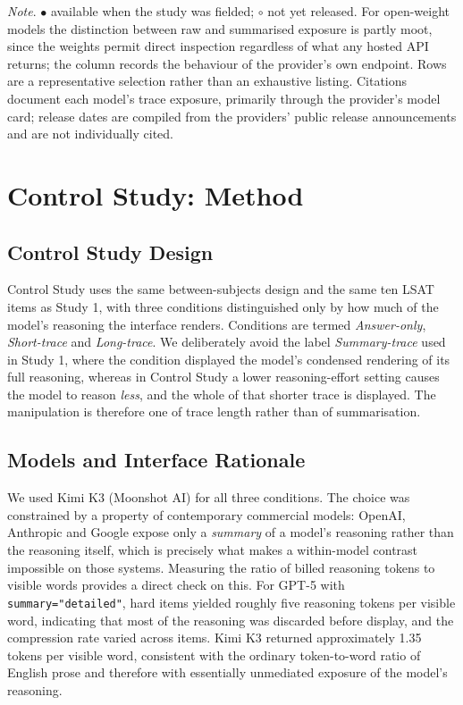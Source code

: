 \documentclass[manuscript,review,anonymous]{acmart}
\begin{document}
\begin{table}[H]
\raggedright \small \textit{Note}. $\bullet$ available when the study was
fielded; $\circ$ not yet released.
For open-weight models the distinction between raw and summarised exposure is
partly moot, since the weights permit direct inspection regardless of what any
hosted API returns; the column records the behaviour of the provider's own
endpoint. Rows are a representative selection rather than an exhaustive listing.
Citations document each model's trace exposure, primarily through the provider's model card; release dates are compiled from the providers' public release announcements and are not individually cited.
\end{table}



\section{Control Study: Method}\label{sec:study2_method}
\subsection{Control Study Design}

Control Study uses the same between-subjects design and the same ten LSAT items as
Study 1, with three conditions distinguished only by how much of the model's
reasoning the interface renders. Conditions are termed \textit{Answer-only},
\textit{Short-trace} and \textit{Long-trace}. We deliberately avoid the label
\textit{Summary-trace} used in Study 1, where the condition displayed the
model's condensed rendering of its full reasoning, whereas in Control Study a lower
reasoning-effort setting causes the model to reason \emph{less}, and the whole
of that shorter trace is displayed. The manipulation is therefore one of trace
length rather than of summarisation.

\subsection{Models and Interface Rationale}
We used Kimi K3 (Moonshot AI) for all three conditions. The choice was
constrained by a property of contemporary commercial models: OpenAI, Anthropic
and Google expose only a \textit{summary} of a model's reasoning rather than the
reasoning itself, which is precisely what makes a within-model contrast
impossible on those systems. Measuring the ratio of billed reasoning tokens to
visible words provides a direct check on this. For GPT-5 with
\texttt{summary="detailed"}, hard items yielded roughly five reasoning tokens per
visible word, indicating that most of the reasoning was discarded before display,
and the compression rate varied across items. Kimi K3 returned approximately
1.35 tokens per visible word, consistent with the ordinary token-to-word ratio of
English prose and therefore with essentially unmediated exposure of the model's
reasoning.
\end{document}
